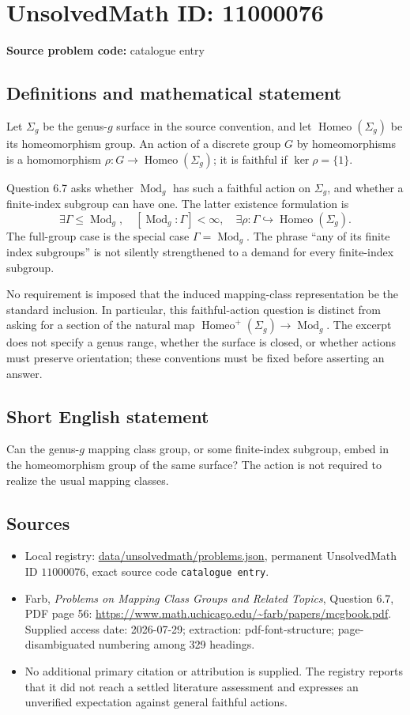 \documentclass[11pt]{article}
\begin{document}
\section*{UnsolvedMath ID: 11000076}
\textbf{Source problem code:} catalogue entry
\subsection{Definitions and mathematical statement}
Let $\Sigma_g$ be the genus-$g$ surface in the source convention, and let $\operatorname{Homeo}(\Sigma_g)$ be its homeomorphism group. An action of a discrete group $G$ by homeomorphisms is a homomorphism $\rho:G\to\operatorname{Homeo}(\Sigma_g)$; it is faithful if $\ker\rho=\{1\}$.

Question 6.7 asks whether $\operatorname{Mod}_g$ has such a faithful action on $\Sigma_g$, and whether a finite-index subgroup can have one. The latter existence formulation is
\[
 \exists\Gamma\leq\operatorname{Mod}_g,\quad
 [\operatorname{Mod}_g:\Gamma]<\infty,\quad
 \exists\rho:\Gamma\hookrightarrow\operatorname{Homeo}(\Sigma_g).
\]
The full-group case is the special case $\Gamma=\operatorname{Mod}_g$. The phrase ``any of its finite index subgroups'' is not silently strengthened to a demand for every finite-index subgroup.

No requirement is imposed that the induced mapping-class representation be the standard inclusion. In particular, this faithful-action question is distinct from asking for a section of the natural map $\operatorname{Homeo}^+(\Sigma_g)\to\operatorname{Mod}_g$. The excerpt does not specify a genus range, whether the surface is closed, or whether actions must preserve orientation; these conventions must be fixed before asserting an answer.
\subsection{Short English statement}
Can the genus-$g$ mapping class group, or some finite-index subgroup, embed in the homeomorphism group of the same surface? The action is not required to realize the usual mapping classes.
\subsection{Sources}
\begin{itemize}
\item Local registry: \url{data/unsolvedmath/problems.json}, permanent UnsolvedMath ID $11000076$, exact source code \texttt{catalogue entry}.
\item Farb, \emph{Problems on Mapping Class Groups and Related Topics}, Question 6.7, PDF page 56: \url{https://www.math.uchicago.edu/~farb/papers/mcgbook.pdf}. Supplied access date: 2026-07-29; extraction: pdf-font-structure; page-disambiguated numbering among 329 headings.
\item No additional primary citation or attribution is supplied. The registry reports that it did not reach a settled literature assessment and expresses an unverified expectation against general faithful actions.
\end{itemize}
\end{document}
